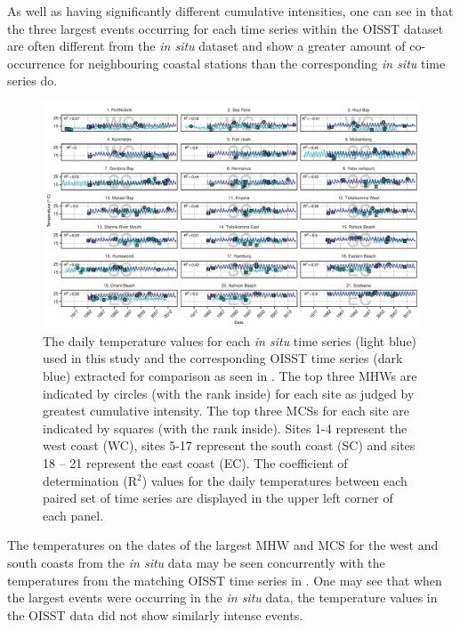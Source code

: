 \documentclass[a4paper,10pt,review]{elsarticle}
\begin{document}
As well as having significantly different cumulative intensities, one can see in  that the three largest events occurring for each time series within the OISST dataset are often different from the \emph{in situ} dataset and show a greater amount of co-occurrence for neighbouring coastal stations than the corresponding \emph{in situ} time series do.

\begin{figure}
\centering
\includegraphics[width=1.0\textwidth]{figure2.pdf}
\caption{The daily temperature values for each \emph{in situ} time series (light blue) used in this study and the corresponding OISST time series (dark blue) extracted for comparison as seen in . The top three MHWs are indicated by circles (with the rank inside) for each site as judged by greatest cumulative intensity. The top three MCSs for each site are indicated by squares (with the rank inside). Sites 1-4 represent the west coast (WC), sites 5-17 represent the south coast (SC) and sites 18 -- 21 represent the east coast (EC). The coefficient of determination (R$^2$) values for the daily temperatures between each paired set of time series are displayed in the upper left corner of each panel.}
\label{fig:Figure2}
\end{figure}

The temperatures on the dates of the largest MHW and MCS for the west and south coasts from the \emph{in situ} data may be seen concurrently with the temperatures from the matching OISST time series in . One may see that when the largest events were occurring in the \emph{in situ} data, the temperature values in the OISST data did not show similarly intense events.
\end{document}
